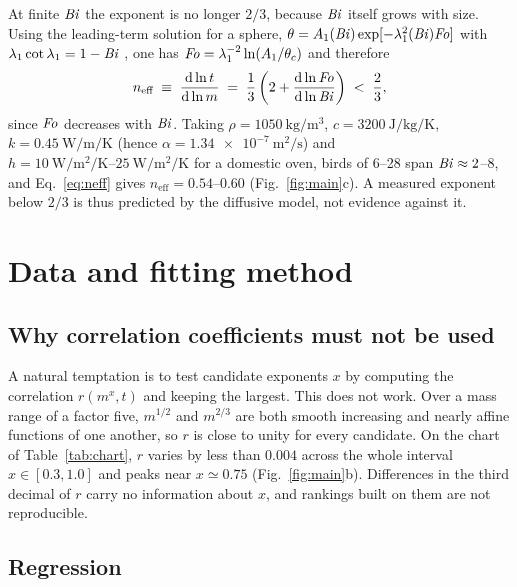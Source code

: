 At finite $\mathit{Bi}$ the exponent is no longer $2/3$, because $\mathit{Bi}$ itself grows
with size. Using the leading-term solution for a sphere,
$\theta = A_{1}(\mathit{Bi})\exp[-\lambda_{1}^{2}(\mathit{Bi})\mathit{Fo}]$ with
$\lambda_{1}\cot\lambda_{1} = 1-\mathit{Bi}$ \cite{incropera}, one has
$\mathit{Fo} = \lambda_{1}^{-2}\ln(A_{1}/\theta_{c})$ and therefore
\begin{equation}
n_{\text{eff}}
\;\equiv\; \frac{\mathrm{d}\ln t}{\mathrm{d}\ln m}
\;=\; \frac{1}{3}\left(2 + \frac{\mathrm{d}\ln \mathit{Fo}}{\mathrm{d}\ln \mathit{Bi}}\right)
\;<\; \frac{2}{3},
\label{eq:neff}
\end{equation}
since $\mathit{Fo}$ decreases with $\mathit{Bi}$. Taking $\rho = \SI{1050}{\kilo\gram\per\cubic\metre}$,
$c = \SI{3200}{\joule\per\kilo\gram\per\kelvin}$,
$k = \SI{0.45}{\watt\per\metre\per\kelvin}$ (hence $\alpha = \SI{1.34e-7}{\square\metre\per\second}$)
and $h = \SIrange{10}{25}{\watt\per\square\metre\per\kelvin}$ for a domestic
oven, birds of \SIrange{6}{28}{\pound} span $\mathit{Bi} \approx 2$--$8$, and
Eq.~\eqref{eq:neff} gives $n_{\text{eff}} = 0.54$--$0.60$
(Fig.~\ref{fig:main}c). A measured exponent below $2/3$ is thus predicted
by the diffusive model, not evidence against it.

\section{Data and fitting method}
\label{sec:method}

\subsection{Why correlation coefficients must not be used}

A natural temptation is to test candidate exponents $x$ by computing the
correlation $r(m^{x},t)$ and keeping the largest. This does not work. Over
a mass range of a factor five, $m^{1/2}$ and $m^{2/3}$ are both smooth
increasing and nearly affine functions of one another, so $r$ is close to
unity for every candidate. On the chart of Table~\ref{tab:chart}, $r$ varies
by less than $0.004$ across the whole interval $x \in [0.3,1.0]$ and
peaks near $x \simeq 0.75$ (Fig.~\ref{fig:main}b). Differences in the third
decimal of $r$ carry no information about $x$, and rankings built on them
are not reproducible.

\subsection{Regression}

